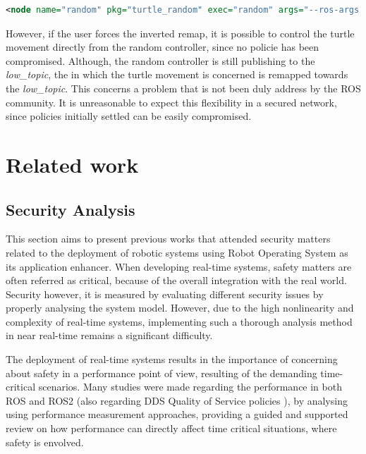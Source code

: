 \begin{lstlisting}[title={Attempting the \textit{low\_topic} remap.}, language=xml]
<node name="random" pkg="turtle_random" exec="random" args="--ros-args --enclave /random -r /low_topic:=/main_topic"/>
\end{lstlisting}

However, if the user forces the inverted remap, it is possible to control the turtle movement directly from the random controller, since no policie has been compromised. Although, the random controller is still publishing to the \textit{low\_topic}, the  in which the turtle movement is concerned is remapped towards the \textit{low\_topic}. This concerns a problem that is not been duly address by the ROS community. It is unreasonable to expect this flexibility in a secured network, since policies initially settled can be easily compromised.

\section{Related work}\label{s:ros-relWork}

\subsection{Security Analysis}

This section aims to present previous works that attended security matters related to the deployment of robotic systems using Robot Operating System as its application enhancer. When developing real-time systems, safety matters are often referred as critical, because of the overall integration with the real world. Security however, it is measured by evaluating different security issues by properly analysing the system model. However, due to the high nonlinearity and complexity of real-time systems, implementing such a thorough analysis method in near real-time remains a significant difficulty. \cite{diao2009design}

The deployment of real-time systems results in the importance of concerning about safety in a performance point of view, resulting of the demanding time-critical scenarios. Many studies were made regarding the performance in both ROS and ROS2 (also regarding DDS Quality of Service policies \cite{maruyama2016exploring}), by analysing using performance measurement approaches, providing a guided and supported review on how performance can directly affect time critical situations, where safety is envolved. \cite{maruyama2016exploring, casini2019response} 

